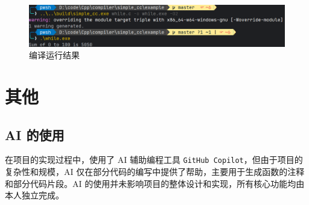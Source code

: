 \documentclass[a4paper]{article}
\begin{document}
\begin{figure}[H]
\centering
\includegraphics[width=\textwidth]{33.png}
\caption{编译运行结果}
\label{fig:output}
\end{figure}

\section{其他}

\subsection{AI 的使用}
在项目的实现过程中，使用了 AI 辅助编程工具 \texttt{GitHub Copilot}，但由于项目的复杂性和规模，AI 仅在部分代码的编写中提供了帮助，主要用于生成函数的注释和部分代码片段。AI 的使用并未影响项目的整体设计和实现，所有核心功能均由本人独立完成。
\end{document}
